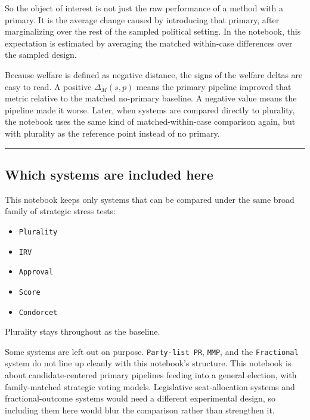 \documentclass[11pt]{article}
\providecommand{\tightlist}{%
      \setlength{\itemsep}{0pt}\setlength{\parskip}{0pt}}
\begin{document}
So the object of interest is not just the raw performance of a method
with a primary. It is the average change caused by introducing that
primary, after marginalizing over the rest of the sampled political
setting. In the notebook, this expectation is estimated by averaging the
matched within-case differences over the sampled design.

Because welfare is defined as negative distance, the signs of the
welfare deltas are easy to read. A positive \(\Delta_M(s, p)\) means the
primary pipeline improved that metric relative to the matched no-primary
baseline. A negative value means the pipeline made it worse. Later, when
systems are compared directly to plurality, the notebook uses the same
kind of matched-within-case comparison again, but with plurality as the
reference point instead of no primary.

    \begin{center}\rule{0.5\linewidth}{0.5pt}\end{center}

\subsection{Which systems are included
here}\label{which-systems-are-included-here}

This notebook keeps only systems that can be compared under the same
broad family of strategic stress tests:

\begin{itemize}
\tightlist
\item
  \texttt{Plurality}
\item
  \texttt{IRV}
\item
  \texttt{Approval}
\item
  \texttt{Score}
\item
  \texttt{Condorcet}
\end{itemize}

Plurality stays throughout as the baseline.

Some systems are left out on purpose. \texttt{Party-list\ PR},
\texttt{MMP}, and the \texttt{Fractional} system do not line up cleanly
with this notebook's structure. This notebook is about
candidate-centered primary pipelines feeding into a general election,
with family-matched strategic voting models. Legislative seat-allocation
systems and fractional-outcome systems would need a different
experimental design, so including them here would blur the comparison
rather than strengthen it.
\end{document}

